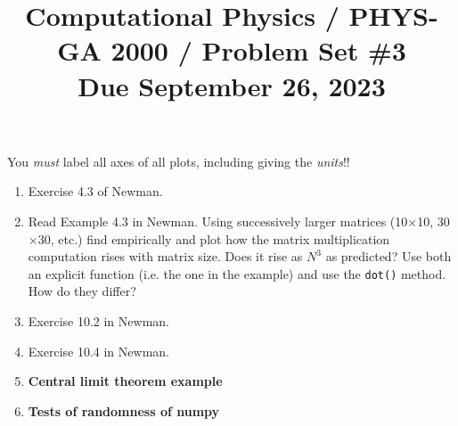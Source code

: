 \documentclass[11pt, preprint]{aastex}
\begin{document}
\title{\bf Computational Physics / PHYS-GA 2000 / Problem Set \#3
\\ Due September 26, 2023}

You {\it must} label all axes of all plots, including giving the {\it
  units}!!

\begin{enumerate}
  \item Exercise 4.3 of Newman.

  \item Read Example 4.3 in Newman. Using successively larger matrices
    (10$\times$10, 30$\times$30, etc.) find empirically and plot how
    the matrix multiplication computation rises with matrix size. Does
    it rise as $N^3$ as predicted? Use both an explicit function
    (i.e. the one in the example) and use the {\tt dot()} method. How
    do they differ?

  \item Exercise 10.2 in Newman.
  \item Exercise 10.4 in Newman.

  \item {\bf Central limit theorem example}
    \item {\bf Tests of randomness of numpy}

\end{enumerate}
\end{document}
